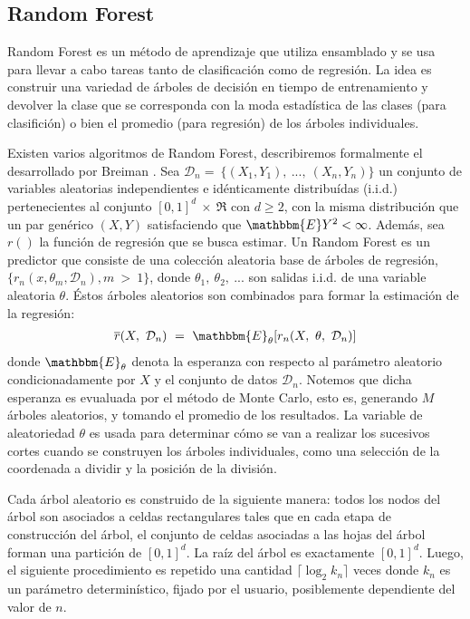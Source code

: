 \subsection{Random Forest}

Random Forest es un método de aprendizaje que utiliza ensamblado y se
usa para llevar a cabo tareas tanto de clasificación como de regresión.
La idea es construir una variedad de árboles de decisión en tiempo de entrenamiento
y devolver la clase que se corresponda con la moda estadística de las clases
(para clasifición) o bien el promedio (para regresión) de los árboles individuales.

Existen varios algoritmos de Random Forest, describiremos formalmente el desarrollado
por Breiman \cite{random_forest}. Sea $\mathcal{D}_{n} = \ \{ (X_{1}, Y_{1}), \ ..., \ (X_{n}, Y_{n})\}$
un conjunto de variables aleatorias independientes e idénticamente distribuídas (i.i.d.)
pertenecientes al conjunto $[0,1]^{d} \ \times \ \Re $ con $d \geq 2$, con la misma distribución que
un par genérico $(X,Y)$ satisfaciendo que $\mathbbm{E}Y^{2} < \infty$. Además,
sea $r()$ la función de regresión que se busca estimar.
Un Random Forest es un predictor que consiste de una colección aleatoria base
de árboles de regresión, $\{ r_{n}(x, \theta_{m}, \mathcal{D}_{n}), m \ > \ 1 \}$, donde
$\theta_{1},\ \theta_{2},\ ...$ son salidas i.i.d. de una variable aleatoria
$\theta$. Éstos árboles aleatorios son combinados para formar la estimación
de la regresión:
\begin{align}
  \overline{r}(X,\ \mathcal{D}_{n})\ =\ \mathbbm{E}_{\theta}[r_{n}(X,\ \theta,\ \mathcal{D}_{n})]
\end{align}
donde $\mathbbm{E}_{\theta}$ denota la esperanza con respecto al parámetro aleatorio
condicionadamente por $X$ y el conjunto de datos $\mathcal{D}_{n}$. Notemos que
dicha esperanza es evualuada por el método de Monte Carlo, esto es, generando
$M$ árboles aleatorios, y tomando el promedio de los resultados. La variable
de aleatoriedad $\theta$ es usada para determinar cómo se van a realizar los
sucesivos cortes cuando se construyen los árboles individuales, como una selección
de la coordenada a dividir y la posición de la división.

Cada árbol aleatorio es construido de la siguiente manera: todos los nodos
del árbol son asociados a celdas rectangulares tales que en cada etapa de
construcción del árbol, el conjunto de celdas asociadas a las hojas del árbol
forman una partición de $[0, 1]^{d}$. La raíz del árbol es exactamente $[0, 1]^{d}$.
Luego, el siguiente procedimiento es repetido una cantidad $\lceil \log_{2}k_{n} \rceil$ veces
donde $k_{n}$ es un parámetro determinístico, fijado por el usuario, posiblemente
dependiente del valor de $n$.

